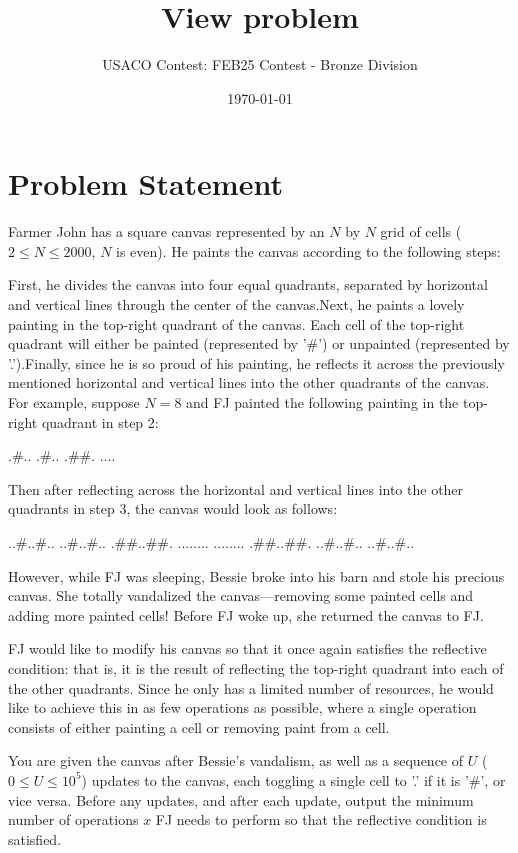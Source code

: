 \documentclass[12pt]{article}
\title{View problem}
\author{USACO Contest: FEB25 Contest - Bronze Division}
\date{\today}
\begin{document}
\maketitle

\section*{Problem Statement}


Farmer John has a square canvas represented by an $N$ by $N$ grid of cells
($2 \leq N \leq 2000$, $N$ is even). He paints the canvas according to the
following steps:

First, he divides the canvas into four equal quadrants, separated by 
horizontal and vertical lines through the center of the canvas.Next, he paints a lovely painting in the top-right quadrant of the canvas.
Each cell of the top-right quadrant will either be painted (represented by '#')
or unpainted (represented by '.').Finally, since he is so proud of his painting, he reflects it across the
previously mentioned horizontal and vertical lines into the other quadrants of
the canvas.
For example, suppose $N=8$ and FJ painted the following painting in the
top-right quadrant in step 2:


.#..
.#..
.##.
....

Then after reflecting across the horizontal and vertical lines into the other
quadrants in step 3,  the canvas would look as follows:


..#..#..
..#..#..
.##..##.
........
........
.##..##.
..#..#..
..#..#..

However, while FJ was sleeping, Bessie broke into his barn and stole his
precious canvas. She totally vandalized the canvas—removing some painted cells
and adding more painted cells! Before FJ woke up, she returned the canvas to FJ.

FJ would like to modify his canvas so that it once again satisfies the
reflective condition: that is, it is the result of reflecting the top-right
quadrant into each of the other quadrants.  Since he only has a limited number
of resources, he would like to achieve this in as  few operations as possible,
where a single operation consists of either painting a cell or removing paint
from a cell. 

You are given the canvas after Bessie's vandalism, as well as a sequence of $U$
($0\le U \leq 10^5$)  updates to the canvas, each toggling a single cell to '.'
if it is '#', or vice versa. Before any updates, and after each update, output
the minimum number of operations $x$ FJ needs to perform so that the reflective
condition is satisfied.
\end{document}
